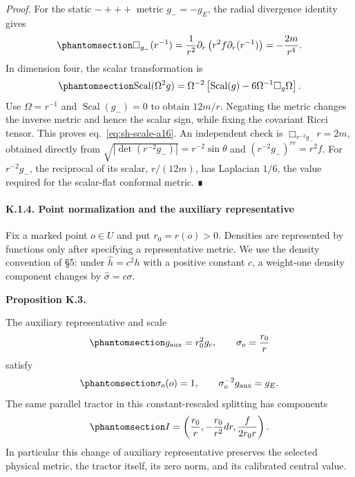 \documentclass[
  english,
  11pt,
  reqno]{amsart}
\makeatletter
\newcommand{\pandocstatementheading}[1]{%
  \par\addpenalty{\@beginparpenalty}%
  \addvspace{.5\baselineskip plus .2\baselineskip minus .2\baselineskip}%
  {\normalfont\bfseries #1\par}%
  \nobreak\@afterindenttrue\@afterheading
}
\makeatother
\begin{document}
\emph{Proof.} For the static \(-+++\) metric \(g_-=-g_E\), the radial
divergence identity gives
\begin{equation}\protect\phantomsection\label{eq:sh-scale-a17}{
\Box_{g_-}(r^{-1})
=\frac1{r^2}\partial_r\left(r^2f\partial_r(r^{-1})\right)
=-\frac{2m}{r^4}.
}\end{equation} In dimension four, the scalar transformation is
\begin{equation}\protect\phantomsection\label{eq:sh-scale-a18}{
\operatorname{Scal}(\Omega^2g)
=\Omega^{-2}\left[\operatorname{Scal}(g)-6\Omega^{-1}\Box_g\Omega\right].
}\end{equation} Use \(\Omega=r^{-1}\) and \(\operatorname{Scal}(g_-)=0\)
to obtain \(12m/r\). Negating the metric changes the inverse metric and
hence the scalar sign, while fixing the covariant Ricci tensor. This
proves eq.~\ref{eq:sh-scale-a16}. An independent check is
\(\Box_{r^{-2}g_-}r=2m\), obtained directly from
\(\sqrt{|\det(r^{-2}g_-)|}=r^{-2}\sin\theta\) and
\((r^{-2}g_-)^{rr}=r^2f\). For \(r^{-2}g_-\), the reciprocal of its
scalar, \(r/(12m)\), has Laplacian \(1/6\), the value required for the
scalar-flat conformal metric. ∎

\protect{}\label{sec:sh-scale-4}

\paragraph{K.1.4. Point normalization and the auxiliary
representative}\label{k.1.4.-point-normalization-and-the-auxiliary-representative}

Fix a marked point \(o\in U\) and put \(r_0=r(o)>0\). Densities are
represented by functions only after specifying a representative metric.
We use the density convention of §5: under \(\widehat h=c^2h\) with a
positive constant \(c\), a weight-one density component changes by
\(\widehat\sigma=c\sigma\).

\pandocstatementheading{\protect{}\label{prop:sh-scale-3}Proposition K.3.}

The auxiliary representative and scale
\begin{equation}\protect\phantomsection\label{eq:sh-scale-a20}{
g_{\rm aux}=r_0^2g_c,\qquad
\sigma_o=\frac{r_0}{r}
}\end{equation} satisfy
\begin{equation}\protect\phantomsection\label{eq:sh-scale-a21}{
\sigma_o(o)=1,\qquad
\sigma_o^{-2}g_{\rm aux}=g_E.
}\end{equation} The same parallel tractor in this constant-rescaled
splitting has components
\begin{equation}\protect\phantomsection\label{eq:sh-scale-a22}{
I=\left(\frac{r_0}{r},-\frac{r_0}{r^2}dr,\frac{f}{2r_0r}\right).
}\end{equation} In particular this change of auxiliary representative
preserves the selected physical metric, the tractor itself, its zero
norm, and its calibrated central value.
\end{document}
